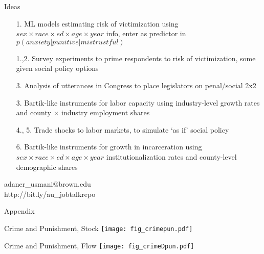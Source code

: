 \documentclass{beamer}
\begin{document}
\begin{frame}{Ideas}
    \begin{itemize}
        \item[1.] ML models estimating risk of victimization using $sex \times race \times ed \times age \times year$ info, enter as predictor in $p(anxiety|punitive|mistrustful)$
        \item[1.,2.] Survey experiments to prime respondents to risk of victimization, some given social policy options
        \item[3.] Analysis of utterances in Congress to place legislators on penal/social 2x2
        \item[3.] Bartik-like instruments for labor capacity using industry-level growth rates and county $\times$ industry employment shares
        \item[4., 5.] Trade shocks to labor markets, to simulate `as if' social policy
        \item[6.] Bartik-like instruments for growth in incarceration using $sex \times race \times ed \times age \times year$ institutionalization rates and county-level demographic shares
    \end{itemize}
\end{frame}

\begin{frame}{}
\begin{center}
    {\Large adaner\_usmani@brown.edu} \\
    {\large http://bit.ly/au\_jobtalkrepo}
\end{center}
\end{frame}


\appendix

\begin{frame}{}
\begin{center}
    {\Large Appendix}
\end{center}
\end{frame}

\begin{frame}{Crime and Punishment, Stock}
\texttt{[image: fig\_crimepun.pdf]}
\end{frame}

\begin{frame}{Crime and Punishment, Flow}
\texttt{[image: fig\_crimeDpun.pdf]}
\end{frame}
\end{document}

